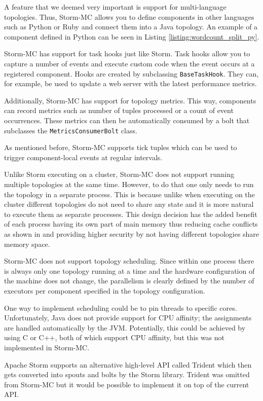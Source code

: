 A feature that we deemed very important is support for multi-language topologies. Thus, Storm-MC allows you to define components in other languages such as Python or Ruby and connect them into a Java topology. An example of a component defined in Python can be seen in Listing \ref{listing:wordcount_split_py}.

Storm-MC has support for task hooks just like Storm. Task hooks allow you to capture a number of events and execute custom code when the event occurs at a registered component. Hooks are created by subclassing \texttt{BaseTaskHook}. They can, for example, be used to update a web server with the latest performance metrics.

Additionally, Storm-MC has support for topology metrics. This way, components can record metrics such as number of tuples processed or a count of event occurrences. These metrics can then be automatically consumed by a bolt that subclasses the \texttt{MetricsConsumerBolt} class.

As mentioned before, Storm-MC supports tick tuples which can be used  to trigger component-local events at regular intervals.

Unlike Storm executing on a cluster, Storm-MC does not support running multiple topologies at the same time. However, to do that one only needs to run the topology in a separate process. This is because unlike when executing on the cluster different topologies do not need to share any state and it is more natural to execute them as separate processes. This design decision has the added benefit of each process having its own part of main memory thus reducing cache conflicts as shown in \citep{Chandra:2005:PIC:1042442.1043432} and providing higher security by not having different topologies share memory space.

Storm-MC does not support topology scheduling. Since within one process there is always only one topology running at a time and the hardware configuration of the machine does not change, the parallelism is clearly defined by the number of executors per component specified in the topology configuration.

One way to implement scheduling could be to pin threads to specific cores. Unfortunately, Java does not provide support for CPU affinity; the assignments are handled automatically by the JVM. Potentially, this could be achieved by using C or C++, both of which support CPU affinity, but this was not implemented in Storm-MC.

Apache Storm supports an alternative high-level API called Trident which then gets converted into spouts and bolts by the Storm library. Trident was omitted from Storm-MC but it would be possible to implement it on top of the current API.

